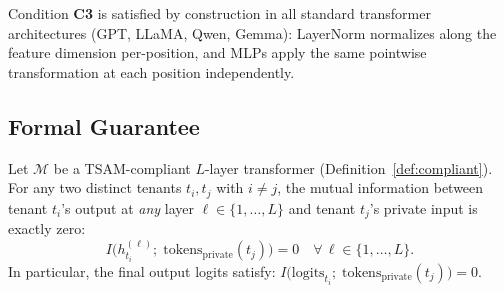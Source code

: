 Condition \textbf{C3} is satisfied by construction in all standard transformer
architectures (GPT, LLaMA, Qwen, Gemma): LayerNorm normalizes along the feature
dimension per-position, and MLPs apply the same pointwise transformation at each
position independently.

\subsection{Formal Guarantee}
\label{sec:e2e:theorem}

\begin{theorem}
\label{thm:e2e}
Let $\mathcal{M}$ be a TSAM-compliant $L$-layer transformer (Definition~\ref{def:compliant}).
For any two distinct tenants $t_i, t_j$ with $i \neq j$, the mutual information
between tenant $t_i$'s output at \emph{any} layer $\ell \in \{1, \ldots, L\}$
and tenant $t_j$'s private input is exactly zero:
\begin{equation}
    I\!\big(h^{(\ell)}_{t_i};\; \mathrm{tokens}_{\mathrm{private}}(t_j)\big) = 0
    \quad \forall\, \ell \in \{1, \ldots, L\}.
\end{equation}
In particular, the final output logits satisfy:
$I\!\big(\mathrm{logits}_{t_i};\; \mathrm{tokens}_{\mathrm{private}}(t_j)\big) = 0$.
\end{theorem}

